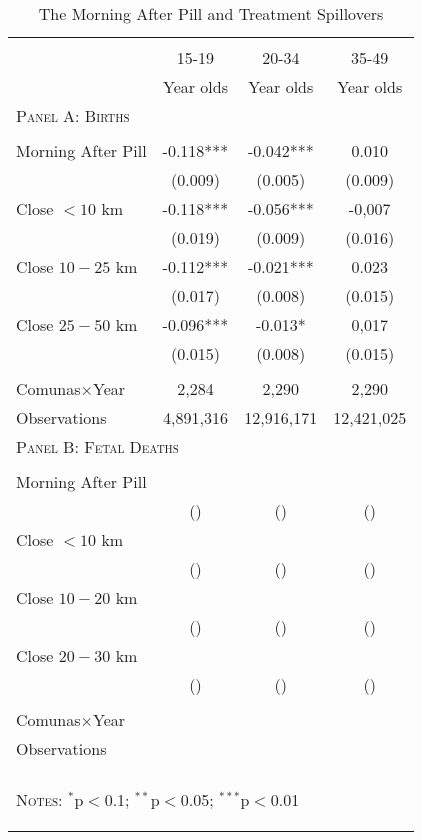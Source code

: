 \begin{table}[!htbp] \centering 
  \caption{The Morning After Pill and Treatment Spillovers}
  \label{TEENtab:Spillover} 
\begin{tabular}{@{\extracolsep{5pt}}lccc}
\\[-1.8ex]\hline 
\hline \\[-1.8ex] 
& 15-19 & 20-34 & 35-49 \\ 
& Year olds & Year olds & Year olds \\ \midrule
 \multicolumn{4}{l}{\textsc{\noindent Panel A: Births}} \\
& & & \\
Morning After Pill & -0.118*** & -0.042*** & 0.010 \\
& (0.009) & (0.005) & (0.009) \\
Close $<10$ km & -0.118*** & -0.056*** & -0,007  \\
 & (0.019) & (0.009) & (0.016) \\
Close $10-25$ km & -0.112*** & -0.021*** & 0.023  \\
 & (0.017) & (0.008) & (0.015) \\
Close $25-50$ km & -0.096*** & -0.013* & 0,017 \\
 & (0.015) & (0.008) & (0.015) \\
 & & & \\
 Comunas$\times$Year &  2,284 & 2,290 & 2,290 \\
 Observations & 4,891,316 & 12,916,171 & 12,421,025 \\ \midrule
 \multicolumn{4}{l}{\textsc{\noindent Panel B: Fetal Deaths}} \\
& & & \\
Morning After Pill & & & \\
 & () & () & () \\
Close $<10$ km & & & \\
 & () & () & () \\
Close $10-20$ km & & & \\
 & () & () & () \\
Close $20-30$ km & & & \\
 & () & () & () \\
 & & & \\
 Comunas$\times$Year &  & & \\
 Observations & & & \\ 
\hline 
\hline \\[-1.8ex]
\multicolumn{4}{p{8cm}}{\begin{footnotesize}\textsc{Notes:}   
$^{*}$p$<$0.1; $^{**}$p$<$0.05; $^{***}$p$<$0.01 \end{footnotesize}} 
\normalsize 
 \end{tabular}
 \end{table}
